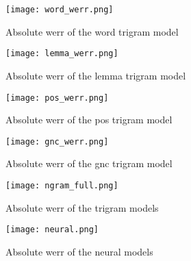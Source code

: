 \begin{figure}[!htbp]
	  \centering
	  \texttt{[image: word\_werr.png]}
	  \caption{Absolute \gls{werr} of the word trigram model}
	      \label{figure:word}
\end{figure}

\begin{figure}[!htbp]
	  \centering
	  \texttt{[image: lemma\_werr.png]}
	  \caption{Absolute \gls{werr} of the lemma trigram model}
	      \label{figure:lemma}
\end{figure}

\begin{figure}[!htbp]
	  \centering
	  \texttt{[image: pos\_werr.png]}
	  \caption{Absolute \gls{werr} of the pos trigram model}
	      \label{figure:pos}
\end{figure}

\begin{figure}[!htbp]
	  \centering
	  \texttt{[image: gnc\_werr.png]}
	  \caption{Absolute \gls{werr} of the gnc trigram model}
	      \label{figure:gnc}
\end{figure}

\begin{figure}[!htbp]
	  \centering
	  \texttt{[image: ngram\_full.png]}
	  \caption{Absolute \gls{werr} of the trigram models}
	      \label{figure:neural}
\end{figure}

\begin{figure}[!htbp]
	  \centering
	  \texttt{[image: neural.png]}
	  \caption{Absolute \gls{werr} of the neural models}
	      \label{figure:neural}
\end{figure}

\FloatBarrier
